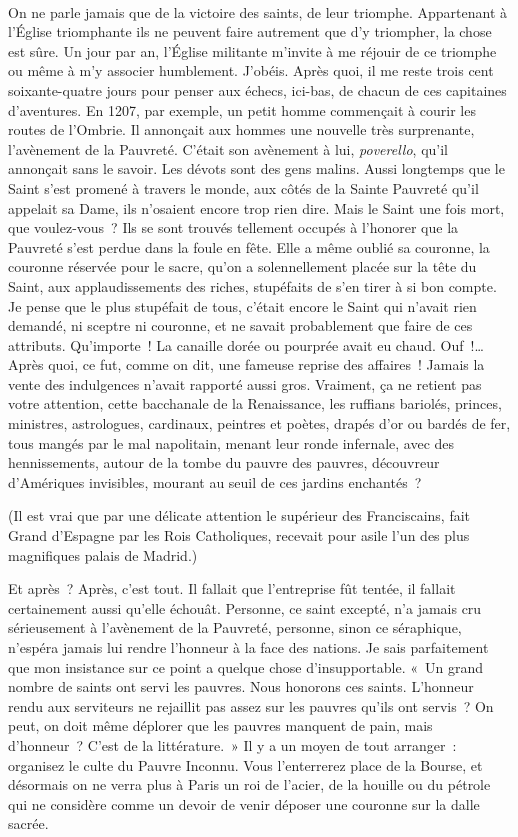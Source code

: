 \documentclass[french,twoside]{book} %
\begin{document}
\noindent  \par
On ne parle jamais que de la victoire des saints, de leur triomphe. Appartenant à l’Église triomphante ils ne peuvent faire autrement que d’y triompher, la chose est sûre. Un jour par an, l’Église militante m’invite à me réjouir de ce triomphe ou même à m’y associer humblement. J’obéis. Après quoi, il me reste trois cent soixante-quatre jours pour penser aux échecs, ici-bas, de chacun de ces capitaines d’aventures. En 1207, par exemple, un petit homme commençait à courir les routes de l’Ombrie. Il annonçait aux hommes une nouvelle très surprenante, l’avènement de la Pauvreté. C’était son avènement à lui, \emph{poverello}, qu’il annonçait sans le savoir. Les dévots sont des gens malins. Aussi longtemps que le Saint s’est promené à travers le monde, aux côtés de la Sainte Pauvreté qu’il appelait sa Dame, ils n’osaient encore trop rien dire. Mais le Saint une fois mort, que voulez-vous ? Ils se sont trouvés tellement occupés à l’honorer que la Pauvreté s’est perdue dans la foule en fête. Elle a même oublié sa couronne, la couronne réservée pour le sacre, qu’on a solennellement placée sur la tête du Saint, aux applaudissements des riches, stupéfaits de s’en tirer à si bon compte. Je pense que le plus stupéfait de tous, c’était encore le Saint qui n’avait rien demandé, ni sceptre ni couronne, et ne savait probablement que faire de ces attributs. Qu’importe ! La canaille dorée ou pourprée avait eu chaud. Ouf !… Après quoi, ce fut, comme on dit, une fameuse reprise des affaires ! Jamais la vente des indulgences n’avait rapporté aussi gros. Vraiment, ça ne retient pas votre attention, cette bacchanale de la Renaissance, les ruffians bariolés, princes, ministres, astrologues, cardinaux, peintres et poètes, drapés d’or ou bardés de fer, tous mangés par le mal napolitain, menant leur ronde infernale, avec des hennissements, autour de la tombe du pauvre des pauvres, découvreur d’Amériques invisibles, mourant au seuil de ces jardins enchantés ?\par
(Il est vrai que par une délicate attention le supérieur des Franciscains, fait Grand d’Espagne par les Rois Catholiques, recevait pour asile l’un des plus magnifiques palais de Madrid.)\par
Et après ? Après, c’est tout. Il fallait que l’entreprise fût tentée, il fallait certainement aussi qu’elle échouât. Personne, ce saint excepté, n’a jamais cru sérieusement à l’avènement de la Pauvreté, personne, sinon ce séraphique, n’espéra jamais lui rendre l’honneur à la face des nations. Je sais parfaitement que mon insistance sur ce point a quelque chose d’insupportable. « Un grand nombre de saints ont servi les pauvres. Nous honorons ces saints. L’honneur rendu aux serviteurs ne rejaillit pas assez sur les pauvres qu’ils ont servis ? On peut, on doit même déplorer que les pauvres manquent de pain, mais d’honneur ? C’est de la littérature. » Il y a un moyen de tout arranger : organisez le culte du Pauvre Inconnu. Vous l’enterrerez place de la Bourse, et désormais on ne verra plus à Paris un roi de l’acier, de la houille ou du pétrole qui ne considère comme un devoir de venir déposer une couronne sur la dalle sacrée.\par
 \par
\end{document}
